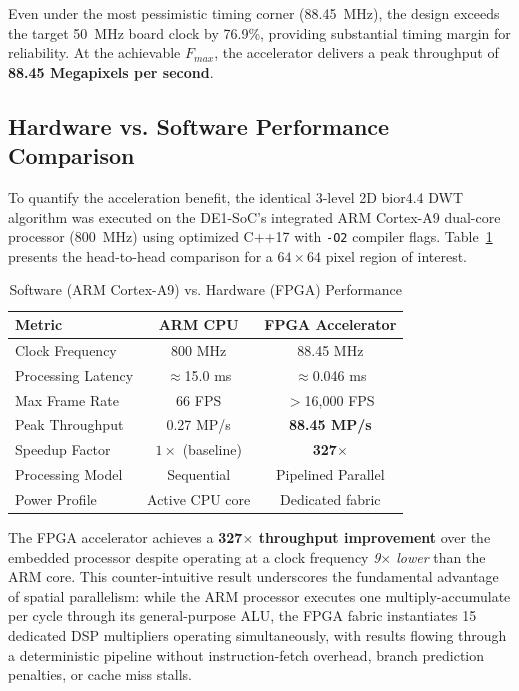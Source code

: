 \documentclass[conference]{IEEEtran}
\begin{document}
Even under the most pessimistic timing corner (88.45~MHz), the design exceeds the target 50~MHz board clock by 76.9\%, providing substantial timing margin for reliability. At the achievable $F_{max}$, the accelerator delivers a peak throughput of \textbf{88.45 Megapixels per second}.

\subsection{Hardware vs. Software Performance Comparison}

To quantify the acceleration benefit, the identical 3-level 2D bior4.4 DWT algorithm was executed on the DE1-SoC's integrated ARM Cortex-A9 dual-core processor (800~MHz) using optimized C++17 with \texttt{-O2} compiler flags. Table~\ref{tab:comparison} presents the head-to-head comparison for a $64 \times 64$ pixel region of interest.

\begin{table}[ht]
\centering
\caption{Software (ARM Cortex-A9) vs. Hardware (FPGA) Performance}
\label{tab:comparison}
\begin{tabular}{@{}p{3.2cm}cc@{}}
\toprule
\textbf{Metric} & \textbf{ARM CPU} & \textbf{FPGA Accelerator} \\ \midrule
Clock Frequency & 800 MHz & 88.45 MHz \\
Processing Latency & $\approx$15.0 ms & $\approx$0.046 ms \\
Max Frame Rate & 66 FPS & $>$16,000 FPS \\
Peak Throughput & 0.27 MP/s & \textbf{88.45 MP/s} \\
Speedup Factor & $1\times$ (baseline) & \textbf{327$\times$} \\
Processing Model & Sequential & Pipelined Parallel \\
Power Profile & Active CPU core & Dedicated fabric \\ \bottomrule
\end{tabular}
\end{table}

The FPGA accelerator achieves a \textbf{327$\times$ throughput improvement} over the embedded processor despite operating at a clock frequency \textit{9$\times$ lower} than the ARM core. This counter-intuitive result underscores the fundamental advantage of spatial parallelism: while the ARM processor executes one multiply-accumulate per cycle through its general-purpose ALU, the FPGA fabric instantiates 15 dedicated DSP multipliers operating simultaneously, with results flowing through a deterministic pipeline without instruction-fetch overhead, branch prediction penalties, or cache miss stalls.
\end{document}

